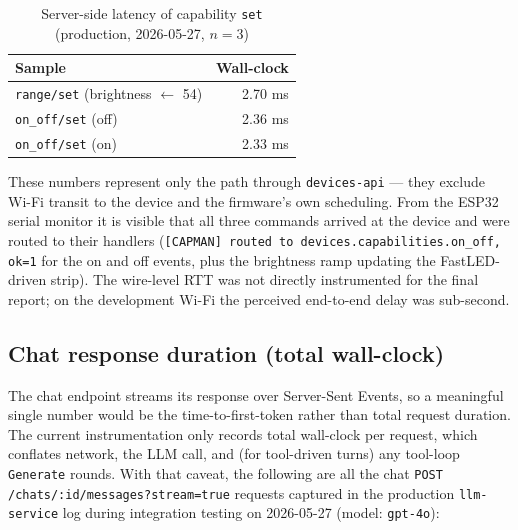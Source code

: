\documentclass[a4paper,12pt]{article}
\begin{document}
\begin{table}[h]
\centering
\caption{Server-side latency of capability \texttt{set} (production, 2026-05-27, $n=3$)}
\label{tab:set-latency}
\begin{tabular}{lr}
\toprule
\textbf{Sample} & \textbf{Wall-clock} \\
\midrule
\verb|range/set| (brightness $\leftarrow$ 54) & 2.70 ms \\
\verb|on_off/set| (off)                        & 2.36 ms \\
\verb|on_off/set| (on)                         & 2.33 ms \\
\bottomrule
\end{tabular}
\end{table}

These numbers represent only the path through \verb|devices-api| --- they exclude Wi-Fi transit to the device and the firmware's own scheduling. From the ESP32 serial monitor it is visible that all three commands arrived at the device and were routed to their handlers (\verb|[CAPMAN] routed to devices.capabilities.on_off, ok=1| for the on and off events, plus the brightness ramp updating the FastLED-driven strip). The wire-level RTT was not directly instrumented for the final report; on the development Wi-Fi the perceived end-to-end delay was sub-second.

\subsection{Chat response duration (total wall-clock)}

The chat endpoint streams its response over Server-Sent Events, so a meaningful single number would be the time-to-first-token rather than total request duration. The current instrumentation only records total wall-clock per request, which conflates network, the LLM call, and (for tool-driven turns) any tool-loop \verb|Generate| rounds. With that caveat, the following are all the chat \verb|POST /chats/:id/messages?stream=true| requests captured in the production \verb|llm-service| log during integration testing on 2026-05-27 (model: \verb|gpt-4o|):
\end{document}
